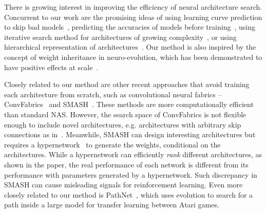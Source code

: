 There is growing interest in improving the efficiency of neural architecture search. Concurrent to our work are the promising ideas of using learning curve prediction to skip bad models~\citep{Baker17}, predicting the accuracies of models before training~\citep{Deng17}, using iterative search method for architectures of growing complexity~\citep{Liu17,Elsken17}, or using hierarchical representation of architectures~\citep{Liu17b}. Our method is also inspired by the concept of weight inheritance in neuro-evolution, which has been demonstrated to have positive effects at scale~\citep{Real17}.

Closely related to our method are other recent approaches that avoid training each architecture from scratch, such as convolutional neural fabrics -- ConvFabrics~\citep{conv_fabrics} and SMASH~\citep{smash_net}. These methods are more computationally efficient than standard NAS. However, the search space of ConvFabrics is not flexible enough to include novel architectures, e.g. architectures with arbitrary skip connections as in~\cite{nas}. Meanwhile, SMASH can design interesting architectures but requires a hypernetwork~\citep{hyper_net} to generate the weights, conditional on the architectures. While a hypernetwork can efficiently \textit{rank} different architectures, as shown in the paper, the real performance of each network is different from its performance with parameters generated by a hypernetwork. Such discrepancy in SMASH can cause misleading signals for reinforcement learning. Even more closely related to our method is PathNet~\citep{fernando2017pathnet}, which uses evolution to search for a path inside a large model for transfer learning between Atari games.




